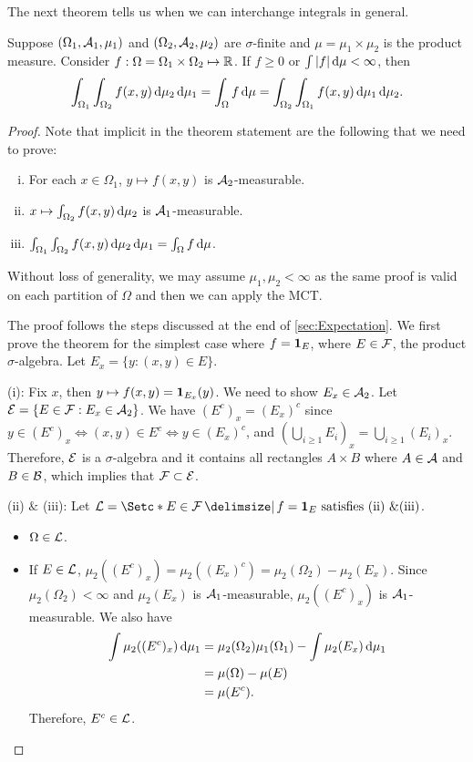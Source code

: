 \documentclass[12pt]{article}
\begin{document}
The next theorem tells us when we can interchange integrals in general.
\begin{Theorem}\label{wk5:Fubini_theorem}
Suppose $(\Omega_1, \mathcal{A}_1, \mu_1)$ and $(\Omega_2, \mathcal{A}_2, \mu_2)$ are $\sigma$-finite and $\mu = \mu_1 \times \mu_2$ is the product measure. Consider $f:\Omega=\Omega_1\times\Omega_2 \mapsto \mathbb{R}$. If $f \geq 0$ or $\int{|f|} \,\mathrm{d}\mu< \infty$, then
\begin{align*}
\int_{\Omega_1} \int_{\Omega_2} f (x,y) \,\mathrm{d} \mu_2 \,\mathrm{d} \mu_1 = \int_{\Omega} f \,\mathrm{d} \mu = \int_{\Omega_2} \int_{\Omega_1} f (x,y) \,\mathrm{d} \mu_1 \,\mathrm{d} \mu_2.
\end{align*}
\end{Theorem}
\begin{proof}
Note that implicit in the theorem statement are the following that we need to prove:
\begin{enumerate}[(i)]
\item For each $x \in \Omega_1$, $y \mapsto f(x,y)$ is $\mathcal{A}_2$-measurable.
\item  $x \mapsto \int_{\Omega_2} f(x,y) \,\mathrm{d} \mu_2$ is $\mathcal{A}_1$-measurable.
\item $\int_{\Omega_1} \int_{\Omega_2} f (x,y) \,\mathrm{d} \mu_2 \,\mathrm{d} \mu_1 = \int_{\Omega} f \,\mathrm{d} \mu$.
\end{enumerate}
Without loss of generality, we may assume $\mu_1,\mu_2<\infty$ as the same proof is valid on each partition of $\Omega$ and then we can apply the MCT.

The proof follows the steps discussed at the end of \cref{sec:Expectation}. We first prove the theorem for the simplest case where $f = {\bf 1}_{E}$, where $E\in \mathcal{F}$, the product $\sigma$-algebra. Let $E_x=\{y:(x,y)\in E\}$. 

(i): Fix $x$, then $y \mapsto f(x,y)= {\bf 1}_{E_x}(y)$. We need to show $E_x \in \mathcal{A}_2$. Let $\mathcal{E}=\{E \in \mathcal{F} : E_x \in \mathcal{A}_2\}$. We have $(E^c)_x=(E_x)^c$ since $y \in (E^c)_x \Leftrightarrow (x,y)\in E^c \Leftrightarrow y\in (E_x)^c$, and $\left(\bigcup_{i\geq1} E_i\right)_x = \bigcup_{i\geq1} (E_i)_x$. Therefore, $\mathcal{E}$ is a $\sigma$-algebra and it contains all rectangles $A \times B$ where $A\in \mathcal{A}$ and $B\in \mathcal{B}$, which implies that $\mathcal{F} \subset \mathcal{E}$.

(ii) $\&$ (iii): Let $\calL=\set*{E \in \calF\given f= \indicatore{E} \text{ satisfies (ii) \&(iii)}}$. 
\begin{itemize}
\item $\Omega \in \mathcal{L}$.
\item  If $E \in \mathcal{L}$, $\mu_2((E^c)_x) =\mu_2((E_x)^c)=\mu_2(\Omega_2)-\mu_2(E_x)$. Since $\mu_2(\Omega_2)< \infty$ and $\mu_2(E_x)$ is $\mathcal{A}_1$-measurable, $\mu_2((E^c)_x)$ is $\mathcal{A}_1$-measurable. We also have
\begin{align*}
\int \mu_2((E^c)_x) \,\mathrm{d} \mu_1
& =\mu_2(\Omega_2)\mu_1(\Omega_1)-\int \mu_2(E_x) \,\mathrm{d} \mu_1\\
& =\mu(\Omega)-\mu(E)\\
& =\mu(E^c).
\end{align*}
Therefore, $E^c \in \mathcal{L}$.


\end{itemize}
\end{proof}
\end{document}
